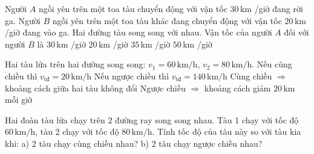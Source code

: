 \begin{ex}
Người $A$ ngồi yên trên một toa tàu chuyển động với vận tốc $30\,\text{km}$ /giờ đang rời ga. Người $B$ ngồi yên trên một toa tàu khác đang chuyển động với vận tốc $20\,\text{km}$ /giờ đang vào ga. Hai đường tàu song song với nhau. Vận tốc của người $A$ đối với người $B$ là
\choice
{$30\,\text{km}$ /giờ}
{$20\,\text{km}$ /giờ}
{$35\,\text{km}$ /giờ}
{\True $50\,\text{km}$ /giờ}
\end{ex}

\begin{ex}
Hai tàu lửa trên hai đường song song: $v_1=60\,\text{km/h}$, $v_2=80\,\text{km/h}$.
\choiceTF
{\True Nếu cùng chiều thì $v_{\text{tđ}}=20\,\text{km/h}$}
{\True Nếu ngược chiều thì $v_{\text{tđ}}=140\,\text{km/h}$}
{Cùng chiều $\Rightarrow$ khoảng cách giữa hai tàu không đổi}
{Ngược chiều $\Rightarrow$ khoảng cách giảm $20\,\text{km}$ mỗi giờ}
\end{ex}

\begin{bt}
Hai đoàn tàu lửa chạy trên $2$ đường ray song song nhau. Tàu 1 chạy với tốc độ $60\,\text{km/h}$, tàu 2 chạy với tốc độ $80\,\text{km/h}$. Tính tốc độ của tàu này so với tàu kia khi: 
a) $2$ tàu chạy cùng chiều nhau? 
b) $2$ tàu chạy ngược chiều nhau?
\end{bt}

